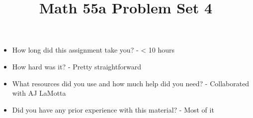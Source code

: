 \documentclass[11pt,letterpaper]{article}
\title{\textbf{Math 55a Problem Set 4}}
\begin{document}
\maketitle
\setcounter{page}{0}
\thispagestyle{empty}

\begin{itemize}
  \item How long did this assignment take you? - < 10 hours
  \item How hard was it? - Pretty straightforward
  \item What resources did you use and how much help did you need? - Collaborated with AJ LaMotta
  \item Did you have any prior experience with this material? - Most of it
\end{itemize}

\pagebreak


\pagebreak


\pagebreak


\pagebreak


\pagebreak


\pagebreak


\pagebreak


\pagebreak


\pagebreak

\end{document}

